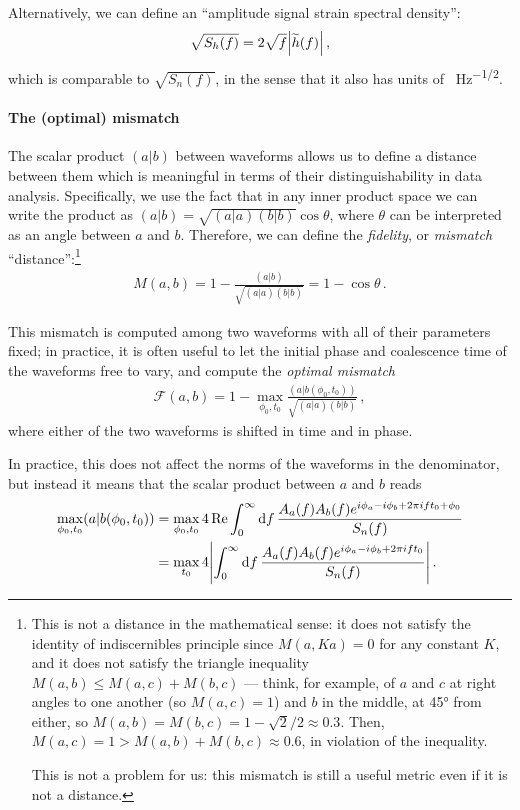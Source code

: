 \documentclass[main.tex]{subfiles}
\begin{document}
Alternatively, we can define an ``amplitude signal strain spectral density'': 
%
\begin{align}
\sqrt{S_h (f)} = 2 \sqrt{f} \abs{\widetilde{h}(f)}
\,,
\end{align}
%
which is comparable to \(\sqrt{S_n(f)}\), in the sense that it also has units of \SI{}{Hz^{-1/2}}.

\paragraph{The (optimal) mismatch}

The scalar product \((a|b)\) between waveforms allows us to define a distance between them which is meaningful in terms of their distinguishability in data analysis.
Specifically, we use the fact that in any inner product space we can write the product as \((a|b) = \sqrt{(a|a) (b|b)} \cos \theta \), where \(\theta \) can be interpreted as an angle between \(a\) and \(b\). 
Therefore, we can define the \emph{fidelity}, or \emph{mismatch} ``distance'':\footnote{This is not a distance in the mathematical sense: it does not satisfy the identity of indiscernibles principle since \(M(a, Ka) = 0\) for any constant \(K\), and it does not satisfy the triangle inequality \(M(a, b) \leq M(a, c) + M(b, c)\) --- think, for example, of \(a\) and \(c\) at right angles to one another (so \(M(a, c) = 1\)) and \(b\) in the middle, at 45° from either, so \(M(a, b) = M(b, c) = 1 - \sqrt{2} / 2 \approx 0.3\). Then, \(M(a,c) = 1 > M(a, b) + M(b, c) \approx 0.6\), in violation of the inequality. 

This is not a problem for us: this mismatch is still a useful metric even if it is not a distance. }
%
\begin{align}
M(a, b) = 1 - \frac{(a|b)}{\sqrt{(a|a) (b|b)}} = 1 - \cos \theta 
\,.
\end{align}

This mismatch is computed among two waveforms with all of their parameters fixed; in practice, it is often useful to let the initial phase and coalescence time of the waveforms free to vary, and compute the \emph{optimal mismatch}
%
\begin{align}
\mathcal{F}(a, b) = 1 - \max_{\phi_0 , t_0 } \frac{(a|b(\phi_0, t_0 ))}{\sqrt{(a|a)(b|b)}}
\,,
\end{align}
%
where either of the two waveforms is shifted in time and in phase.

In practice, this does not affect the norms of the waveforms in the denominator, but instead it means that the scalar product between \(a\) and \(b\) reads 
%
\begin{align}
\max_{\phi_0 , t_0 } (a|b(\phi_0 , t_0 )) 
&= \max_{\phi_0, t_0 } 4 \Re \int_{0}^{\infty } \dd{f} \frac{A_a (f) A_b(f) e^{i \phi_a - i \phi _b + 2 \pi i f t_0 + \phi_0 }}{S_n (f)} \\
&= \max_{t_0 } 4 \abs{\int_{0}^{\infty } \dd{f} \frac{A_a (f) A_b(f) e^{i \phi_a - i \phi _b + 2 \pi i f t_0 }}{S_n (f)}}
\,.
\end{align}
\end{document}
